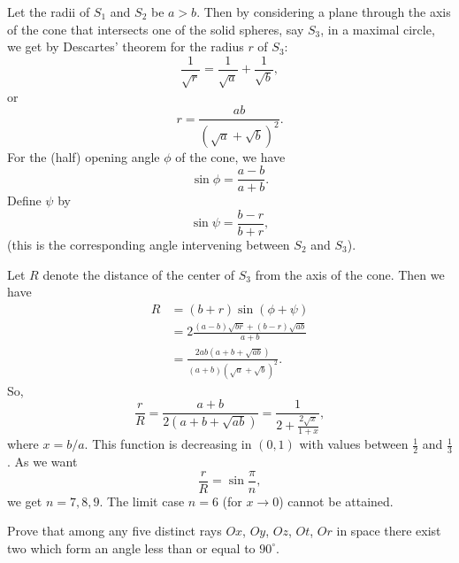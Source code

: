 \documentclass[12pt,a4paper]{memoir}
\theoremstyle{definition}
\begin{document}
\begin{solution}[name={Solution by Spanferkel}]
	Let the radii of $S_1$ and $S_2$ be $a>b$. Then by considering a plane through the axis of the cone that intersects one of the solid spheres, say $S_3$, in a maximal circle, we get by Descartes' theorem for the radius $r$ of $S_3$:
	$$\frac1{\sqrt{r}}=\frac1{\sqrt{a}}+\frac1{\sqrt{b}},$$ or $$r=\frac{ab}{(\sqrt{a}+\sqrt{b})^2}.$$
	For the (half) opening angle $\phi$ of the cone, we have $$\sin\phi=\frac{a-b}{a+b}.$$ Define $\psi$ by $$\sin\psi=\frac{b-r}{b+r},$$ (this is the corresponding angle intervening between $S_2$ and $S_3$).
	
	Let $R$ denote the distance of the center of $S_3$ from the axis of the cone. Then we have
	\begin{align*}
		R &= (b+r)\sin(\phi+\psi)\\
		&=2\frac{(a-b)\sqrt{br}+(b-r)\sqrt{ab}}{a+b} \\
		&=\frac{2ab(a+b+\sqrt{ab})}{(a+b)(\sqrt{a}+\sqrt{b})^2}.
	\end{align*}
	So, $$\frac rR=\frac{a+b}{2(a+b+\sqrt{ab})}=\frac{1}{2+\frac{2\sqrt{x}}{1+x}},$$ where $x=b/a$. This function is decreasing in $(0,1)$ with values between $\frac12$ and $\frac13$. As we want $$\frac rR=\sin\frac\pi n,$$ we get $n=7,8,9$. The limit case $n=6$ (for $x\to 0$) cannot be attained.
\end{solution}




\begin{question}[name={1987 Vietnam}]
	Prove that among any five distinct rays $ Ox$, $ Oy$, $ Oz$, $ Ot$, $ Or$ in space there exist two which form an angle less than or equal to $ 90^{\circ}$.
\end{question}
\end{document}
